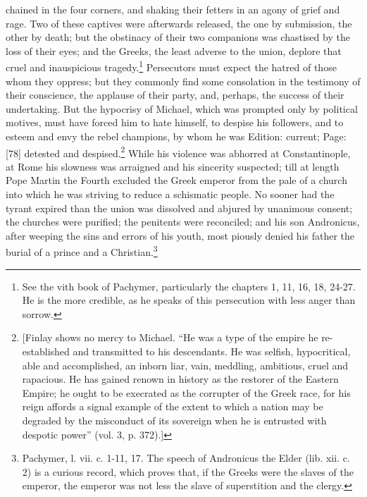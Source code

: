 chained in the four corners, and shaking their fetters in an agony of grief and rage. Two of these captives were afterwards released, the one by submission, the other by death; but the obstinacy of their two companions was chastised by the loss of their eyes; and the Greeks, the least adverse to the union, deplore that cruel and inauspicious tragedy.\footnote{See the vith book of Pachymer, particularly the chapters 1, 11, 16, 18, 24-27. He is the more credible, as he speaks of this persecution with less anger than sorrow.} Persecutors must expect the hatred of those whom they oppress; but they commonly find some consolation in the testimony of their conscience, the applause of their party, and, perhaps, the success of their undertaking. But the hypocrisy of Michael, which was prompted only by political motives, must have forced him to hate himself, to despise his followers, and to esteem and envy the rebel champions, by whom he was Edition: current; Page: [78] detested and despised.\footnote{[Finlay shows no mercy to Michael. \texthebrew{“}He was a type of the empire he re-established and transmitted to his descendants. He was selfish, hypocritical, able and accomplished, an inborn liar, vain, meddling, ambitious, cruel and rapacious. He has gained renown in history as the restorer of the Eastern Empire; he ought to be execrated as the corrupter of the Greek race, for his reign affords a signal example of the extent to which a nation may be degraded by the misconduct of its sovereign when he is entrusted with despotic power\texthebrew{}” (vol. 3, p. 372).]} While his violence was abhorred at Constantinople, at Rome his slowness was arraigned and his sincerity suspected; till at length Pope Martin the Fourth excluded the Greek emperor from the pale of a church into which he was striving to reduce a schismatic people. No sooner had the tyrant expired than the union was dissolved and abjured by unanimous consent; the churches were purified; the penitents were reconciled; and his son Andronicus, after weeping the sins and errors of his youth, most piously denied his father the burial of a prince and a Christian.\footnote{Pachymer, l. vii. c. 1-11, 17. The speech of Andronicus the Elder (lib. xii. c. 2) is a curious record, which proves that, if the Greeks were the slaves of the emperor, the emperor was not less the slave of superstition and the clergy.}

